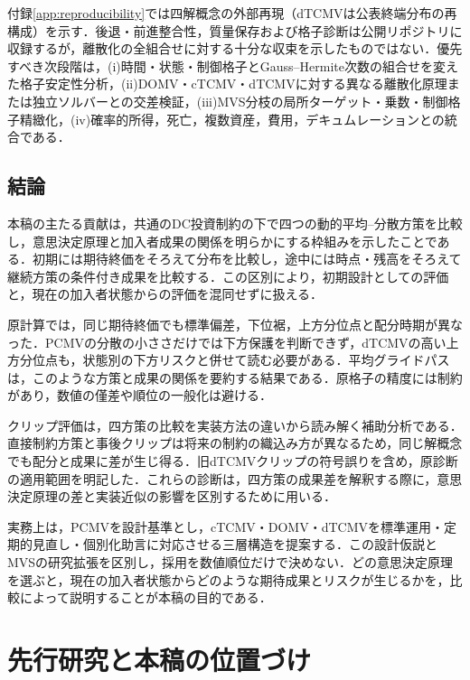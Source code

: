 \documentclass[10pt,a4paper]{article}
\theoremstyle{plain}
\theoremstyle{definition}
\begin{document}
付録\ref{app:reproducibility}では四解概念の外部再現（dTCMVは公表終端分布の再構成）を示す．後退・前進整合性，質量保存および格子診断は公開リポジトリに収録するが，離散化の全組合せに対する十分な収束を示したものではない．優先すべき次段階は，(i)時間・状態・制御格子とGauss--Hermite次数の組合せを変えた格子安定性分析，(ii)DOMV・cTCMV・dTCMVに対する異なる離散化原理または独立ソルバーとの交差検証，(iii)MVS分枝の局所ターゲット・乗数・制御格子精緻化，(iv)確率的所得，死亡，複数資産，費用，デキュムレーションとの統合である．

\subsection{結論}
本稿の主たる貢献は，共通のDC投資制約の下で四つの動的平均--分散方策を比較し，意思決定原理と加入者成果の関係を明らかにする枠組みを示したことである．初期には期待終価をそろえて分布を比較し，途中には時点・残高をそろえて継続方策の条件付き成果を比較する．この区別により，初期設計としての評価と，現在の加入者状態からの評価を混同せずに扱える．

原計算では，同じ期待終価でも標準偏差，下位裾，上方分位点と配分時期が異なった．PCMVの分散の小ささだけでは下方保護を判断できず，dTCMVの高い上方分位点も，状態別の下方リスクと併せて読む必要がある．平均グライドパスは，このような方策と成果の関係を要約する結果である．原格子の精度には制約があり，数値の僅差や順位の一般化は避ける．

クリップ評価は，四方策の比較を実装方法の違いから読み解く補助分析である．直接制約方策と事後クリップは将来の制約の織込み方が異なるため，同じ解概念でも配分と成果に差が生じ得る．旧dTCMVクリップの符号誤りを含め，原診断の適用範囲を明記した．これらの診断は，四方策の成果差を解釈する際に，意思決定原理の差と実装近似の影響を区別するために用いる．

実務上は，PCMVを設計基準とし，cTCMV・DOMV・dTCMVを標準運用・定期的見直し・個別化助言に対応させる三層構造を提案する．この設計仮説とMVSの研究拡張を区別し，採用を数値順位だけで決めない．どの意思決定原理を選ぶと，現在の加入者状態からどのような期待成果とリスクが生じるかを，比較によって説明することが本稿の目的である．

\FloatBarrier\clearpage\appendix
\small
\setlength{\abovedisplayskip}{4pt plus 1pt}
\setlength{\belowdisplayskip}{4pt plus 1pt}

\section{先行研究と本稿の位置づけ}
\label{sec:literature}
\end{document}
